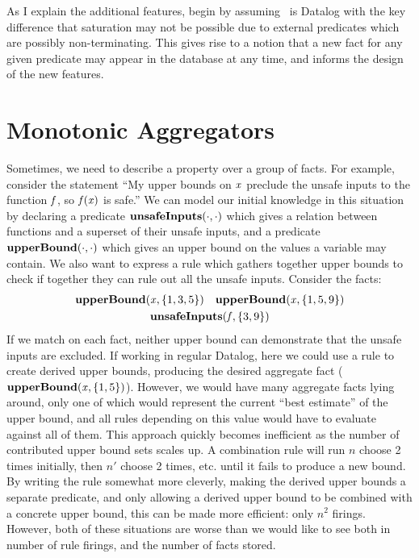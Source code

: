 As I explain the additional features, begin by assuming \sysname\ is Datalog with the key difference that saturation may not be possible due to external predicates which are possibly non-terminating.
This gives rise to a notion that a new fact for any given predicate may appear in the database at any time, and informs the design of the new features.

\section{Monotonic Aggregators}
\label{sec:monagg}
Sometimes, we need to describe a property over a group of facts.
For example, consider the statement ``My upper bounds on ${\it x}$ preclude the unsafe inputs to the function ${\it f}$, so ${\it f}({\it x})$ is safe.''
We can model our initial knowledge in this situation by declaring a predicate ${\bf unsafeInputs}(\cdot, \cdot)$ which gives a relation between functions and a superset of their unsafe inputs, and a predicate ${\bf upperBound}(\cdot, \cdot)$ which gives an upper bound on the values a variable may contain.
We also want to express a rule which gathers together upper bounds to check if together they can rule out all the unsafe inputs.
Consider the facts:
\begin{gather*}
  {\bf upperBound}({\it x}, \{1, 3, 5\}) \quad {\bf upperBound}({\it x}, \{1, 5, 9\})\\
  {\bf unsafeInputs}({\it f}, \{3, 9\})\\
\end{gather*}
If we match on each fact, neither upper bound can demonstrate that the unsafe inputs are excluded.
If working in regular Datalog, here we could use a rule to create derived upper bounds, producing the desired aggregate fact (${\bf upperBound}({\it x}, \{1, 5\})$).
However, we would have many aggregate facts lying around, only one of which would represent the current ``best estimate'' of the upper bound, and all rules depending on this value would have to evaluate against all of them.
This approach quickly becomes inefficient as the number of contributed upper bound sets scales up.
A combination rule will run $n$ choose 2 times initially, then $n'$ choose 2 times, etc. until it fails to produce a new bound.
By writing the rule somewhat more cleverly, making the derived upper bounds a separate predicate, and only allowing a derived upper bound to be combined with a concrete upper bound, this can be made more efficient: only $n^2$ firings.
However, both of these situations are worse than we would like to see both in number of rule firings, and the number of facts stored.

